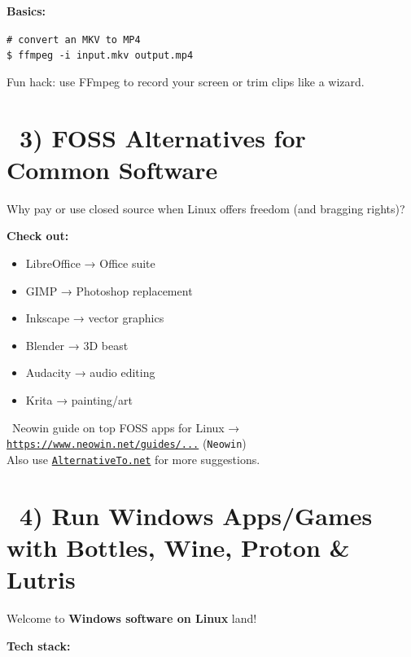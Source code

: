 \documentclass[12pt]{article}
\newcommand{\syncicon}{\faSync}
\newcommand{\wineicon}{\faWindows}
\begin{document}
\textbf{Basics:}

\begin{highlightbox}
\texttt{\# convert an MKV to MP4}\\
\texttt{\$ ffmpeg -i input.mkv output.mp4}
\end{highlightbox}

Fun hack: use FFmpeg to record your screen or trim clips like a wizard. \faMagic

\section*{\syncicon\ 3) FOSS Alternatives for Common Software}

Why pay or use closed source when Linux offers freedom (and bragging rights)?

\textbf{Check out:}

\begin{itemize}
    \item LibreOffice → Office suite
    \item GIMP → Photoshop replacement
    \item Inkscape → vector graphics
    \item Blender → 3D beast
    \item Audacity → audio editing
    \item Krita → painting/art
\end{itemize}

\begin{infobox}
\faArrowRight\ Neowin guide on top FOSS apps for Linux → \href{https://www.neowin.net/guides/top-10-foss-apps-to-make-your-linux-experience-more-enjoyable/}{\texttt{https://www.neowin.net/guides/...}} (\texttt{Neowin})\\
Also use \href{https://alternativeto.net}{\texttt{AlternativeTo.net}} for more suggestions.
\end{infobox}

\section*{\wineicon\ 4) Run Windows Apps/Games with Bottles, Wine, Proton \& Lutris}

Welcome to \textbf{Windows software on Linux} land!

\textbf{Tech stack:}
\end{document}
